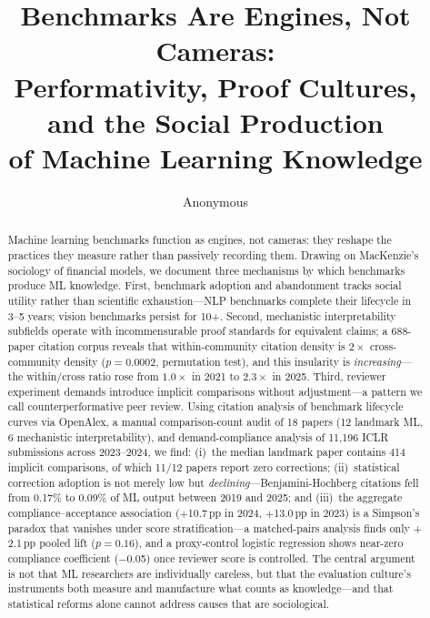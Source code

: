 \documentclass{article}
\title{Benchmarks Are Engines, Not Cameras:\\Performativity, Proof Cultures, and the Social Production\\of Machine Learning Knowledge}
\author{Anonymous}
\begin{document}
\maketitle

\begin{abstract}
Machine learning benchmarks function as engines, not cameras: they reshape the practices they measure rather than passively recording them. Drawing on MacKenzie's sociology of financial models, we document three mechanisms by which benchmarks produce ML knowledge. First, benchmark adoption and abandonment tracks social utility rather than scientific exhaustion---NLP benchmarks complete their lifecycle in 3--5 years; vision benchmarks persist for 10+. Second, mechanistic interpretability subfields operate with incommensurable proof standards for equivalent claims; a 688-paper citation corpus reveals that within-community citation density is $2{\times}$ cross-community density ($p = 0.0002$, permutation test), and this insularity is \emph{increasing}---the within/cross ratio rose from $1.0{\times}$ in 2021 to $2.3{\times}$ in 2025. Third, reviewer experiment demands introduce implicit comparisons without adjustment---a pattern we call counterperformative peer review. Using citation analysis of benchmark lifecycle curves via OpenAlex, a manual comparison-count audit of 18 papers (12 landmark ML, 6 mechanistic interpretability), and demand-compliance analysis of 11,196 ICLR submissions across 2023--2024, we find: (i)~the median landmark paper contains 414 implicit comparisons, of which 11/12 papers report zero corrections; (ii)~statistical correction adoption is not merely low but \emph{declining}---Benjamini-Hochberg citations fell from 0.17\% to 0.09\% of ML output between 2019 and 2025; and (iii)~the aggregate compliance--acceptance association ($+$10.7\,pp in 2024, $+$13.0\,pp in 2023) is a Simpson's paradox that vanishes under score stratification---a matched-pairs analysis finds only $+$2.1\,pp pooled lift ($p = 0.16$), and a proxy-control logistic regression shows near-zero compliance coefficient ($-$0.05) once reviewer score is controlled. The central argument is not that ML researchers are individually careless, but that the evaluation culture's instruments both measure and manufacture what counts as knowledge---and that statistical reforms alone cannot address causes that are sociological.
\end{abstract}
\end{document}

